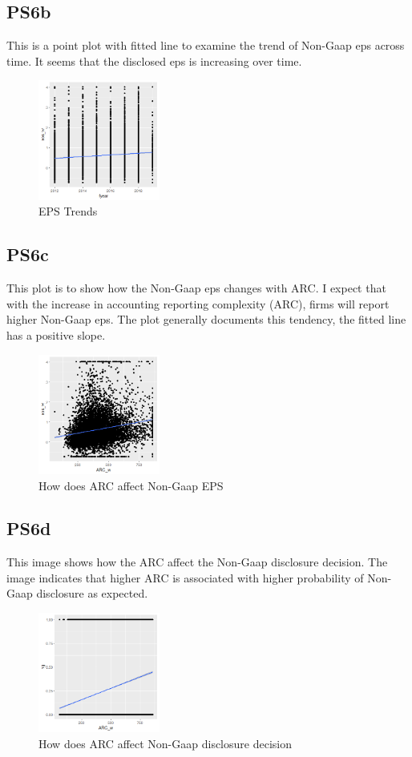\documentclass{article}
\begin{document}
\subsection{PS6b}
This is a point plot with fitted line to examine the trend of Non-Gaap eps across time. It seems that the disclosed eps is increasing over time.
\begin{figure}[htp]
    \centering
    \includegraphics[width=4cm]{PS6b_Wang.png}
    \caption{EPS Trends}
    \label{fig:EPS trends}
\end{figure}

\subsection{PS6c}
This plot is to show how the Non-Gaap eps changes with ARC. I expect that with the increase in accounting reporting complexity (ARC), firms will report higher Non-Gaap eps. The plot generally documents this tendency, the fitted line has a positive slope.

\begin{figure}[htp]
    \centering
    \includegraphics[width=4cm]{PS6c_Wang.png}
    \caption{How does ARC affect Non-Gaap EPS}
    \label{fig:ARC vs EPS}
\end{figure}

\subsection{PS6d}
This image shows how the ARC affect the Non-Gaap disclosure decision. The image indicates that higher ARC is associated with higher probability of Non-Gaap disclosure as expected.

\begin{figure}[htp]
    \centering
    \includegraphics[width=4cm]{PS6d_Wang.png}
    \caption{How does ARC affect Non-Gaap disclosure decision}
    \label{fig:ARC vs NG}
\end{figure}
\end{document}
